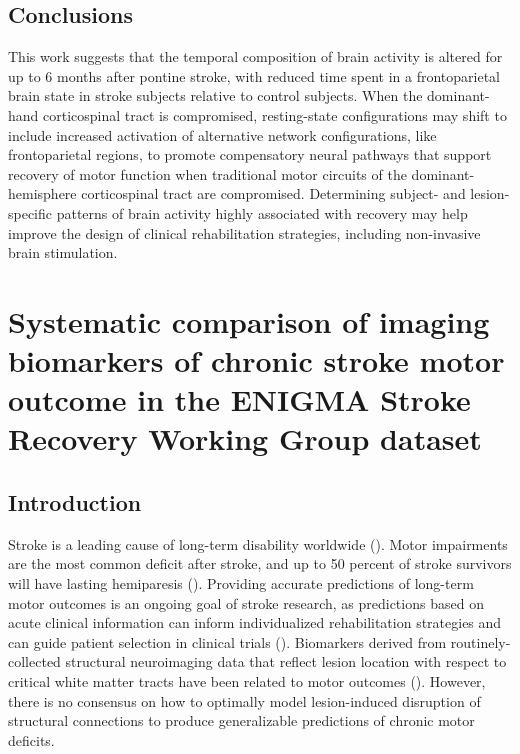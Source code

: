 \documentclass[phd,tocprelim]{cornell}
\begin{document}
\section{Conclusions}
    This work suggests that the temporal composition of brain activity is altered for up to 6 months after pontine stroke, with reduced time spent in a frontoparietal brain state in stroke subjects relative to control subjects. When the dominant-hand corticospinal tract is compromised, resting-state configurations may shift to include increased activation of alternative network configurations, like frontoparietal regions, to promote compensatory neural pathways that support recovery of motor function when traditional motor circuits of the dominant-hemisphere corticospinal tract are compromised. Determining subject- and  lesion-specific patterns of brain activity highly associated with recovery may help improve the design of clinical rehabilitation strategies, including non-invasive brain stimulation.


\label{chap:3}
\chapter{Systematic comparison of imaging biomarkers of chronic stroke motor outcome in the ENIGMA Stroke Recovery Working Group dataset}
\section{Introduction}
Stroke is a leading cause of long-term disability worldwide (\cite{Katan2018-qn}). Motor impairments are the most common deficit after stroke, and up to 50 percent of stroke survivors will have lasting hemiparesis (\cite{Kelly-Hayes2003-sp}). Providing accurate predictions of long-term motor outcomes is an ongoing goal of stroke research, as predictions based on acute clinical information can inform individualized rehabilitation strategies and can guide patient selection in clinical trials (\cite{Bonkhoff2022-op, Boyd2017-gs}). Biomarkers derived from routinely-collected structural neuroimaging data that reflect lesion location with respect to critical white matter tracts have been related to motor outcomes (\cite{Tozlu2020-qa, Kuceyeski2016-vj, Griffis2019-cy, Salvalaggio2020-pe, Bowren2022-rs}). However, there is no consensus on how to optimally model lesion-induced disruption of structural connections to produce generalizable predictions of chronic motor deficits. 
\end{document}
